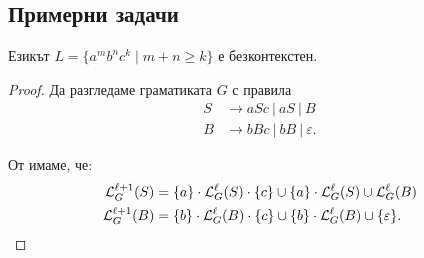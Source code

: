 \subsection{Примерни задачи}

\begin{example}
  Езикът $L = \{a^mb^nc^k\mid m+n \geq k\}$ е безконтекстен.
\end{example}  
\begin{proof}
  Да разгледаме граматиката $G$ с правила
  \begin{align*}
    S& \rightarrow aSc\ |\ aS\ |\ B\\
    B& \rightarrow bBc\ |\  bB\ |\ \varepsilon.
  \end{align*}

  От  имаме, че:
  \begin{align*}
    \mathcal{L}^{\ell+1}_G(S) & = \{a\} \cdot \mathcal{L}^\ell_G(S) \cdot \{c\} \cup \{a\}\cdot \mathcal{L}^\ell_G(S) \cup \mathcal{L}^\ell_G(B)\\
    \mathcal{L}^{\ell+1}_G(B) & = \{b\} \cdot \mathcal{L}^\ell_G(B) \cdot \{c\} \cup \{b\} \cdot \mathcal{L}^\ell_G(B) \cup \{\varepsilon\}.
  \end{align*}


\end{proof}
